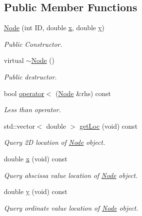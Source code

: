 \subsection*{Public Member Functions}
\begin{DoxyCompactItemize}
\item 
\mbox{\hyperlink{class_node_a75560296eb48863988f31c8adf370dcf}{Node}} (int ID, double \mbox{\hyperlink{class_node_a05d427a6fef833a49306b2adb52ef722}{x}}, double \mbox{\hyperlink{class_node_a5a06c0e486aa39a994b6a2fa674aa493}{y}})
\begin{DoxyCompactList}\small\item\em Public Constructor. \end{DoxyCompactList}\item 
virtual \mbox{\hyperlink{class_node_af5e3fa79300bf5f3f2f3ecae6e795a94}{$\sim$\+Node}} ()
\begin{DoxyCompactList}\small\item\em Public destructor. \end{DoxyCompactList}\item 
bool \mbox{\hyperlink{class_node_aeda47a1decedb8fc3835579d75b7d65f}{operator$<$}} (\mbox{\hyperlink{class_node}{Node}} \&rhs) const
\begin{DoxyCompactList}\small\item\em Less than operator. \end{DoxyCompactList}\item 
std\+::vector$<$ double $>$ \mbox{\hyperlink{class_node_ae59cc8d62b6cfa623252b98341c3084c}{get\+Loc}} (void) const
\begin{DoxyCompactList}\small\item\em Query 2D location of \mbox{\hyperlink{class_node}{Node}} object. \end{DoxyCompactList}\item 
double \mbox{\hyperlink{class_node_a05d427a6fef833a49306b2adb52ef722}{x}} (void) const
\begin{DoxyCompactList}\small\item\em Query abscissa value location of \mbox{\hyperlink{class_node}{Node}} object. \end{DoxyCompactList}\item 
double \mbox{\hyperlink{class_node_a5a06c0e486aa39a994b6a2fa674aa493}{y}} (void) const
\begin{DoxyCompactList}\small\item\em Query ordinate value location of \mbox{\hyperlink{class_node}{Node}} object. \end{DoxyCompactList}\end{DoxyCompactItemize}
